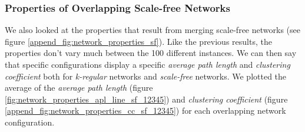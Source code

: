 \documentclass[preprint,number]{elsarticle}
\begin{document}
        \subsubsection{Properties of Overlapping Scale-free Networks}
        \noindent We also looked at the properties that result from merging scale-free networks (see
        figure \ref{append_fig:network_properties_sf}). Like the previous results, the properties
        don't vary much between the 100 different instances. We can then say that specific
        configurations display a specific \textit{average path length} and \textit{clustering
          coefficient} both for \textit{k-regular} networks and \textit{scale-free} networks. We
        plotted the average of the \textit{average path length} (figure
        \ref{fig:network_properties_apl_line_sf_12345}) and \textit{clustering coefficient} (figure
        \ref{append_fig:network_properties_cc_sf_12345}) for each overlapping network configuration.
\end{document}
